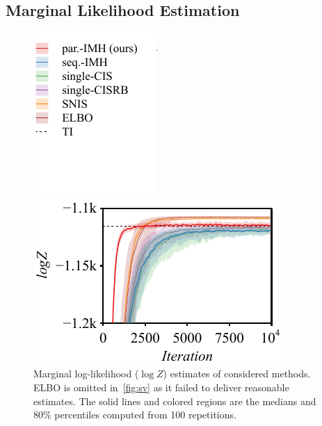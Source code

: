 \subsection{Marginal Likelihood Estimation}\label{section:mll}
%
\begin{figure}[H]
  \centering
  \begin{minipage}[b]{0.17\linewidth}
    \centering
    \includegraphics[scale=0.75]{figures/radon_03.pdf}
  \end{minipage}
  \begin{minipage}[b]{0.35\linewidth}
    \centering
    \includegraphics[scale=0.7]{figures/radon_02.pdf}
  \end{minipage}
  \caption{Marginal log-likelihood (\(\log Z\)) estimates of considered methods.
    ELBO is omitted in~\cref{fig:sv} as it failed to deliver reasonable estimates.
    The solid lines and colored regions are the medians and 80\% percentiles computed from 100 repetitions.
  }\label{fig:marginal_likelihood}
\end{figure}
%
